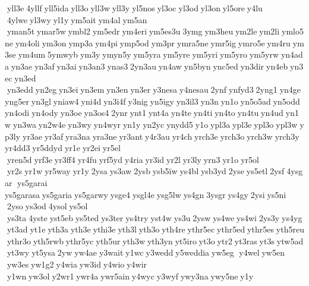  yll3e 4yllf yll5ida yll3o yll3w yll3y yl5nos yl3oc yl3od yl3on yl5ore y4lu  4ylwe yl3wy yl1y ym5ait ym4al ym5an  yman5t ymar5w ymbl2 ym5edr ym4eri ym5es3u 3ymg ym3heu ym2le ym2li ymlo5ne ym4oli ym3on ymp3a ym4pi ymp5od ym3pr ymra5ne ymr5ig ymro5e ym4ru ym3se ym4um 5ymwyb ym3y ymyn5y ym5yra ym5yre ym5yri ym5yro ym5yrw yn4ada yn3ae yn3af yn3ai yn3an3 ynas3 2yn3au yn4aw yn5byn ync5ed yn3dir yn4eb yn3ec yn3ed  yn3edd yn2eg yn3ei yn3em yn3en yn3er y3nesa y4nesau 2ynf ynfyd3 2yng1 yn4ge yng5er yn3gl yniaw4 yni4d yn3i4f y3nig yn5igy yn3il3 yn3n yn1o yn5o5ad yn5odd yn4odi yn4ody yn3oe yn3os4 2ynr ynt1 ynt4a yn4te yn4ti yn4to yn4tu yn4ud yn1w yn3wa yn2w4e yn3wy yn4wyr yn1y yn2yc ynydd5 y1o ypl3a ypl3e ypl3o ypl3w yp3ly yr3ae yr3af yra3na yra3ne yr3ant y4r3au yr4ch yrch3e yrch3o yrch3w yrch3y yr4dd3 yr5ddyd yr1e yr2ei yr5el  yren5d yrf3e yr3ff4 yr4fu yrf5yd y4ria yr3id yr2l yr3ly yrn3 yr1o yr5ol  yr2s yr1w yr5way yr1y 2ysa ys3aw 2ysb ysb5ïw ys4bl ysb3yd 2yse ys5etl 2ysf 4ysgar  ys5garai 	ys5garasa ys5garia ys5garwy ysge4 ysgl4e ysg5lw ys4gn 3ysgr ys4gy 2ysi ys5ni  2yso ys3od 4ysol ys5ol  ys3ta 4yste yst5eb ys5ted ys3ter ys4try yst4w ys3u 2ysw ys4we ys4wi 2ys3y ys4yg yt3ad yt1e yth3a yth3e ythi3e yth3l yth3o yth4re ythr5ec ythr5ed ythr5es yth5reu ythr3o yth5rwb ythr5yc yth5ur yth3w yth3yn yt5iro yt3o ytr2 yt3ras yt3s ytw5ad yt3wy yt5ysa 2yw yw4ae y3wait y1wc y3wedd y5weddia yw5eg  y4wel yw5en  yw3es yw1g2 y4wia yw3id y4wio y4wir  y1wn yw3ol y2wr1 ywr4a ywr5ain y4wyc y3wyf ywy3na ywy5ne y1y